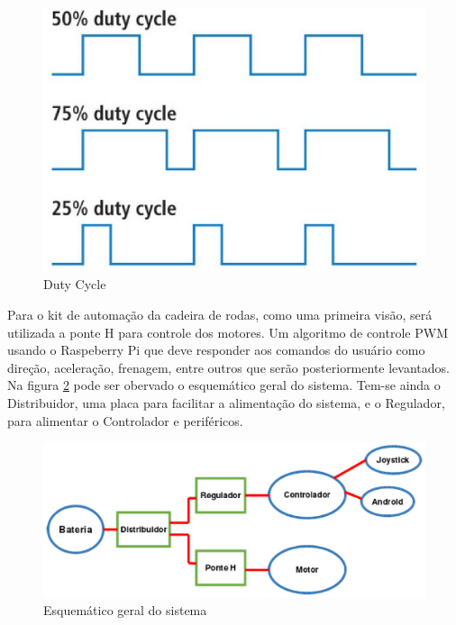\begin{figure}[!htb]
\centering
  \includegraphics[keepaspectratio=true,scale=0.5]{figuras/controle/ondas_quadradas}
\caption{Duty Cycle}
\label{fig:ondas_quadradas}
\end{figure}

Para o kit de automação da cadeira de rodas, como uma primeira visão, será utilizada a ponte H para controle dos motores. Um algoritmo de controle PWM usando o Raspeberry Pi que deve responder aos comandos do usuário como direção, aceleração, frenagem, entre outros que serão posteriormente levantados. Na figura \ref{fig:esquema_controle} pode ser obervado o esquemático geral do sistema. Tem-se ainda o Distribuidor, uma placa para facilitar a alimentação do sistema, e o Regulador, para alimentar o Controlador e periféricos.

\begin{figure}[!htb]
\centering
  \includegraphics[keepaspectratio=true,scale=0.6]{figuras/controle/esquema_controle}
\caption{Esquemático geral do sistema}
\label{fig:esquema_controle}
\end{figure}

